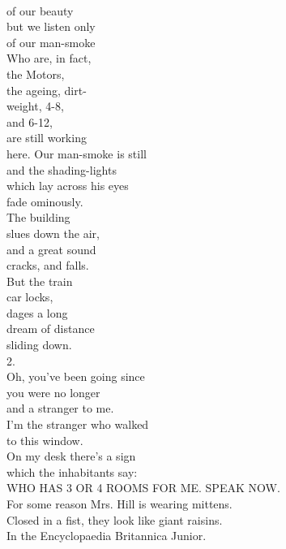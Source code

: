 \documentclass[smalldemyvopaper,11pt,twoside,onecolumn,openright,extrafontsizes]{memoir}
\begin{document}
\\of our beauty
\\but we listen only
\\of our man-smoke
\\Who are, in fact,
\\the Motors,
\\the ageing, dirt-
\\weight, 4-8,
\\and 6-12,
\\are still working
\\here. Our man-smoke is still
\\and the shading-lights
\\which lay across his eyes
\\fade ominously.
\\The building
\\slues down the air,
\\and a great sound
\\cracks, and falls.
\\But the train
\\car locks,
\\dages a long
\\dream of distance
\\sliding down.
\\2.
\\Oh, you've been going since
\\you were no longer
\\and a stranger to me.
\\I'm the stranger who walked
\\to this window.
\\On my desk there's a sign
\\which the inhabitants say:
\\WHO HAS 3 OR 4 ROOMS FOR ME. SPEAK NOW.
\\For some reason Mrs. Hill is wearing mittens.
\\Closed in a fist, they look like giant raisins.
\\In the Encyclopaedia Britannica Junior.
\end{document}

